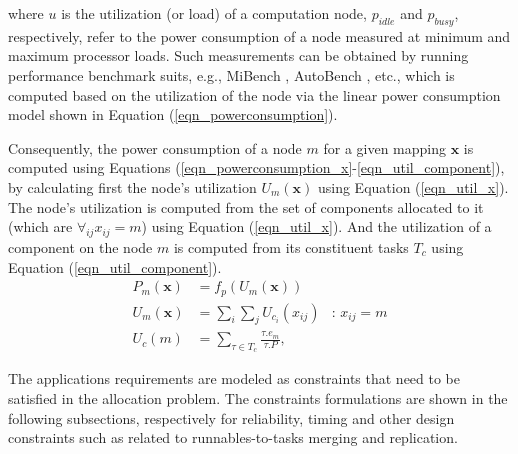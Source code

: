 where $u$ is the utilization (or load) of a computation node, $p_{idle}$ and $p_{busy}$, respectively, refer to the power consumption of a node measured at minimum and maximum processor loads. Such measurements can be obtained by running performance benchmark suits, e.g., MiBench \cite{Guthaus2001MiBench:Suite}, AutoBench \cite{EMBC2018AutoBenchProcessors}, etc., which is computed based on the utilization of the node via the linear power consumption model shown in Equation (\ref{eqn_powerconsumption}).

Consequently, the power consumption of a node $m$ for a given mapping $\textbf{x}$ is computed using Equations (\ref{eqn_powerconsumption_x}-\ref{eqn_util_component}), by calculating first the node's utilization $U_m(\textbf{x})$ using Equation (\ref{eqn_util_x}). The node's utilization is computed from the set of components allocated to it (which are $\forall_{ij} x_{ij}=m$) using Equation (\ref{eqn_util_x}). And the utilization of a component on the node $m$ is computed from its constituent tasks $T_c$ using Equation (\ref{eqn_util_component}).
\begin{align}
	\label{eqn_powerconsumption_x}
P_m(\textbf{x}) & =f_p(U_m(\textbf{x}))                         &  \\
	\label{eqn_util_x}
U_{m}(\textbf{x})           & = \sum_{i}{\sum_{j}{U_{c_i}}(x_{ij})}         & \text{: }x_{ij}=m \\
	\label{eqn_util_component}
U_c(m)              & = \sum_{\tau\in T_c} \frac{\tau.e_m}{\tau.P}, &
\end{align}

The applications requirements are modeled as constraints that need to be satisfied in the allocation problem. The constraints formulations are shown in the following subsections, respectively for reliability, timing and other design constraints such as related to runnables-to-tasks merging and replication.


